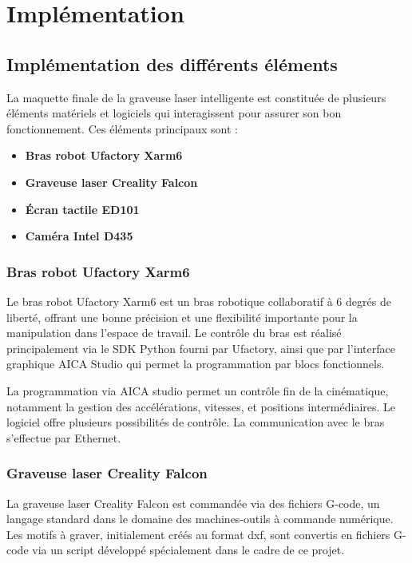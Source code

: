 \chapter{Implémentation}

\section{Implémentation des différents éléments}

La maquette finale de la graveuse laser intelligente est constituée de plusieurs éléments matériels et logiciels qui interagissent pour assurer son bon fonctionnement. Ces éléments principaux sont :

\begin{itemize}
    \item \textbf{Bras robot Ufactory Xarm6}
    \item \textbf{Graveuse laser Creality Falcon}
    \item \textbf{Écran tactile ED101}
    \item \textbf{Caméra Intel D435}
\end{itemize}

\subsection{Bras robot Ufactory Xarm6}

Le bras robot Ufactory Xarm6 est un bras robotique collaboratif à 6 degrés de liberté, offrant une bonne précision et une flexibilité importante pour la manipulation dans l’espace de travail. Le contrôle du bras est réalisé principalement via le SDK Python fourni par Ufactory, ainsi que par l’interface graphique AICA Studio qui permet la programmation par blocs fonctionnels.

La programmation via AICA studio permet un contrôle fin de la cinématique, notamment la gestion des accélérations, vitesses, et positions intermédiaires. Le logiciel offre plusieurs possibilités de contrôle. La communication avec le bras s’effectue par Ethernet.

\subsection{Graveuse laser Creality Falcon}

La graveuse laser Creality Falcon est commandée via des fichiers G-code, un langage standard dans le domaine des machines-outils à commande numérique. Les motifs à graver, initialement créés au format \gls{dxf}, sont convertis en fichiers G-code via un script développé spécialement dans le cadre de ce projet.

